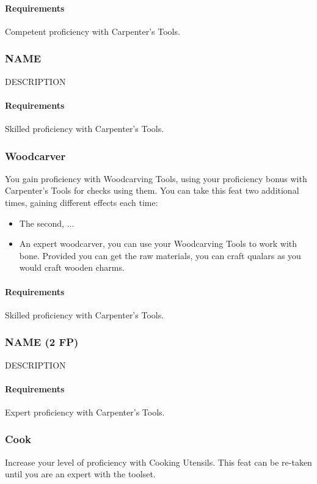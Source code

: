     \paragraph{Requirements} Competent proficiency with Carpenter's Tools.
\subsubsection{NAME} \label{feat::name}
    DESCRIPTION
    \paragraph{Requirements} Skilled proficiency with Carpenter's Tools.
\subsubsection{Woodcarver} \label{feat::woodcarver}
    You gain proficiency with Woodcarving Tools, using your proficiency bonus with Carpenter's Tools for checks using them.
    You can take this feat two additional times, gaining different effects each time:
    \begin{itemize}
        \item The second, ...
        \item An expert woodcarver, you can use your Woodcarving Tools to work with bone.
        Provided you can get the raw materials, you can craft qualars as you would craft wooden charms.
    \end{itemize}
    \paragraph{Requirements} Skilled proficiency with Carpenter's Tools.
\subsubsection{NAME (2 FP)} \label{feat::name}
    DESCRIPTION
    \paragraph{Requirements} Expert proficiency with Carpenter's Tools.
\subsubsection{Cook} \label{feat::cook}
    Increase your level of proficiency with Cooking Utensils.
    This feat can be re-taken until you are an expert with the toolset.
